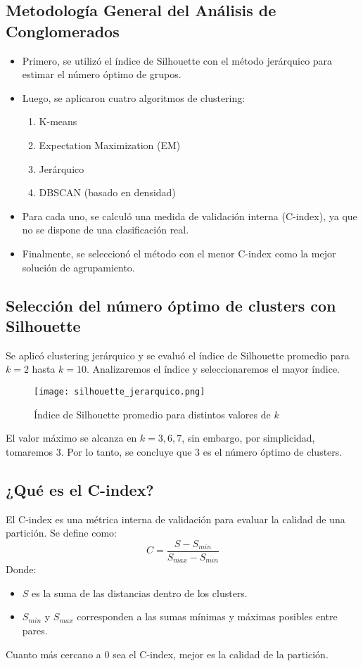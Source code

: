 \documentclass[12pt]{report}
\begin{document}
\subsection{Metodología General del Análisis de Conglomerados}
\begin{itemize}
    \item Primero, se utilizó el índice de Silhouette con el método jerárquico para estimar el número óptimo de grupos.
    \item Luego, se aplicaron cuatro algoritmos de clustering:
    \begin{enumerate}
        \item K-means
        \item Expectation Maximization (EM)
        \item Jerárquico
        \item DBSCAN (basado en densidad)
    \end{enumerate}
    \item Para cada uno, se calculó una medida de validación interna (C-index), ya que no se dispone de una clasificación real.
    \item Finalmente, se seleccionó el método con el menor C-index como la mejor solución de agrupamiento.
\end{itemize}

\newpage
\subsection{Selección del número óptimo de clusters con Silhouette}
Se aplicó clustering jerárquico y se evaluó el índice de Silhouette promedio para \(k = 2\) hasta \(k = 10\). Analizaremos el índice y seleccionaremos el mayor índice.

\begin{figure}[H]
    \centering
    \texttt{[image: silhouette\_jerarquico.png]}
    \caption{Índice de Silhouette promedio para distintos valores de \(k\)}
\end{figure}

\noindent El valor máximo se alcanza en \(k = 3,6,7\), sin embargo, por simplicidad, tomaremos 3. Por lo tanto, se concluye que 3 es el número óptimo de clusters.

\subsection{¿Qué es el C-index?}
El C-index es una métrica interna de validación para evaluar la calidad de una partición. Se define como:
\[ C = \frac{S - S_{min}}{S_{max} - S_{min}} \]
Donde:
\begin{itemize}
    \item $S$ es la suma de las distancias dentro de los clusters.
    \item $S_{min}$ y $S_{max}$ corresponden a las sumas mínimas y máximas posibles entre pares.
\end{itemize}
Cuanto más cercano a 0 sea el C-index, mejor es la calidad de la partición.
\newpage
\end{document}
